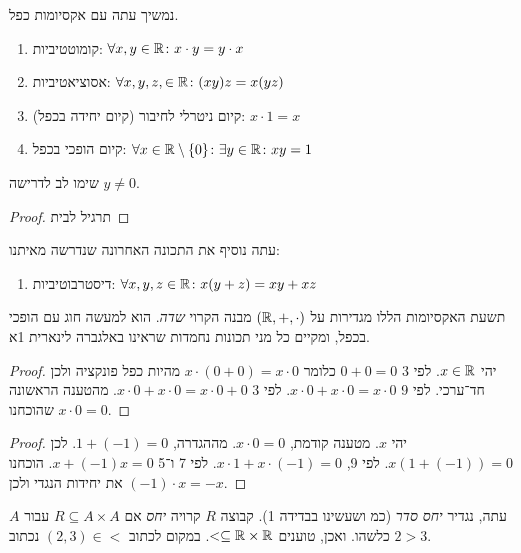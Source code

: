 \documentclass[name=רשימות חשבון דיפרנציאלי ואינטגרלי 1א]{../../../tex/classes/megasumPreamble}
\begin{document}
	נמשיך עתה עם אקסיומות כפל.

	\begin{enumerate}
		\item קומוטטיביות: \hfill $\forall x, y \in \R\co x\cdot y = y \cdot x$
		\item אסוציאטיביות: \hfill $\forall x, y, z, \in \R\co (xy)z = x(yz)$
		\item קיום ניטרלי לחיבור (קיום יחידה בכפל): \hfill $x \cdot 1 = x$
		\item קיום הופכי בכפל: \hfill $\forall x \in \R\setminus\{0\}\co \exists y \in \R\co xy = 1$
	\end{enumerate}
	שימו לב לדרישה $y \neq 0$.

	\begin{proof}
	 תרגיל לבית
	\end{proof}

	עתה נוסיף את התכונה האחרונה שנדרשה מאיתנו:
	\begin{enumerate}
		\item דיסטרבוטיביות: $\forall x, y, z \in \R\co x(y + z) = xy + xz$
	\end{enumerate}

	תשעת האקסיומות הללו מגדירות על $(\R, +, \cdot)$ מבנה הקרוי \textit{שדה}. הוא למעשה חוג עם הופכי בכפל, ומקיים כל מני תכונות נחמדות שראינו באלגברה לינארית 1א.

	\begin{proof}
		יהי $x \in \R$. לפי 3 $0 + 0 = 0$ כלומר $x \cdot (0 + 0) = x \cdot 0$ מהיות כפל פונקציה ולכן חד־ערכי. לפי 9 $x \cdot 0 + x \cdot 0 = x \cdot 0$. לפי 3 $x \cdot 0 + x \cdot 0 = x \cdot 0 + 0$. מהטענה הראשונה שהוכחנו $x \cdot 0 = 0$.
	\end{proof}
	\begin{proof}
		יהי $x$. מטענה קודמת, $x \cdot 0 = 0$. מההגדרה, $1 + (-1) = 0$. לכן $x(1 + (-1)) = 0$. לפי 9, $x \cdot 1 + x \cdot (-1) = 0$. לפי 7 ו־5 $x + (-1)x = 0$. הוכחנו את יחידות הנגדי ולכן $(-1) \cdot x = -x$.
	\end{proof}

	עתה, נגדיר \textit{יחס סדר} (כמ ושעשינו בבדידה 1). קבוצה $R$ קרויה \textit{יחס} אם $R \subseteq A \times A$ עבור $A$ כלשהו. ואכן, טוענים $< \subseteq \R\times \R$. במקום לכתוב $(2, 3) \in <$ נכתוב $2> 3$.
\end{document}
